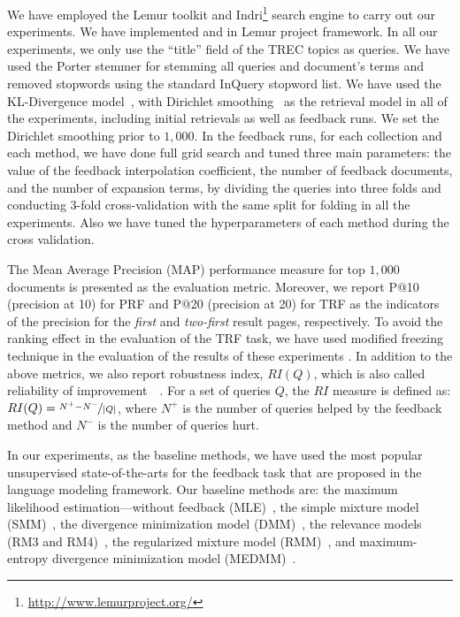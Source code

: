 We have employed the Lemur toolkit and Indri\footnote{\url{http://www.lemurproject.org/}} search engine to carry out our experiments. We have implemented \acswlm and \acrswlm in Lemur project framework. 
In all our experiments, we only use the ``title'' field of the TREC topics as queries. 
We have used the Porter stemmer for stemming all queries and document's terms and removed stopwords using the standard InQuery stopword list. 
We have used the KL-Divergence model~\citep{Lafferty:2001}, with Dirichlet smoothing~\citep{Zhai:2001} as the retrieval model in all of the experiments, including initial retrievals as well as feedback runs.
We set the Dirichlet smoothing prior to $1,000$.  In the feedback runs, for each collection and each method, we have done full grid search and tuned three main parameters: the value of the feedback interpolation coefficient, the number of feedback documents, and the number of expansion terms, by dividing the queries into three folds and conducting 3-fold cross-validation with the same split for folding in all the experiments.  Also we have tuned the hyperparameters of each method during the cross validation.

%
The Mean Average Precision (MAP) performance measure for top $1,000$ documents is presented as the evaluation metric. 
Moreover, we report P@10 (precision at 10) for PRF and P@20 (precision at 20) for TRF as the indicators of the precision for the \emph{first} and \emph{two-first} result pages, respectively.  
To avoid the ranking effect in the evaluation of the TRF task, we have used modified freezing technique in the evaluation of the results of these experiments \citep{cirillo:1969,Harman:1992,Ruthven:2003}. In addition to the above metrics, we also report robustness index, $RI(Q)$, which is also called reliability of improvement~~\citep{Collins-Thompson:2007}. For a set of
queries $Q$, the $RI$ measure is defined as: $RI(Q) = \nicefrac{N^+ - N^-}{|Q|}$, where $N^+$ is the number of queries helped by the feedback method and $N^-$ is the number of queries hurt.

In our experiments, as the baseline methods, we have used the most popular unsupervised state-of-the-arts for the feedback task that are proposed in the language modeling framework. 
Our baseline methods are: the maximum likelihood estimation\:---\:without feedback (MLE)~\citep{Lafferty:2001}, the simple mixture model (SMM)~\citep{Zhai:SMM:2001},  the divergence minimization model (DMM)~\citep{Zhai:SMM:2001}, the relevance models (RM3 and RM4)~\citep{Abdul-jaleel:2004,Lavrenko:2001}, the regularized mixture model (RMM)~\citep{Tao:2006}, and maximum-entropy divergence minimization model (MEDMM)~\citep{Lv:2014}. 


